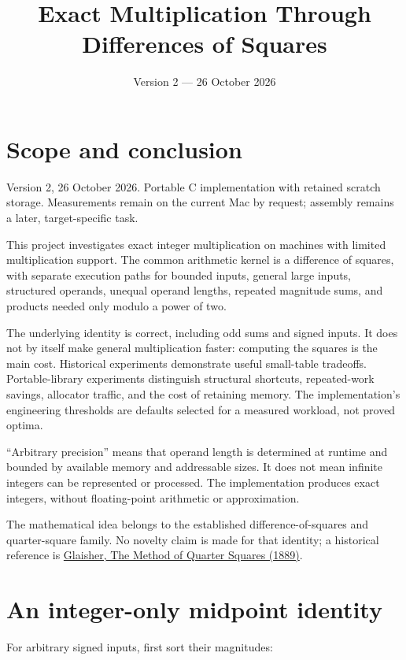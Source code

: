 \documentclass[11pt,a4paper]{article}
\title{Exact Multiplication Through Differences of Squares}
\author{}
\date{Version 2 --- 26 October 2026}
\begin{document}
\maketitle
\tableofcontents
\newpage

\section{Scope and conclusion}

Version 2, 26 October 2026. Portable C implementation with retained scratch storage. Measurements remain on the current Mac by request; assembly remains a later, target-specific task.

This project investigates exact integer multiplication on machines with limited multiplication support. The common arithmetic kernel is a difference of squares, with separate execution paths for bounded inputs, general large inputs, structured operands, unequal operand lengths, repeated magnitude sums, and products needed only modulo a power of two.

The underlying identity is correct, including odd sums and signed inputs. It does not by itself make general multiplication faster: computing the squares is the main cost. Historical experiments demonstrate useful small-table tradeoffs. Portable-library experiments distinguish structural shortcuts, repeated-work savings, allocator traffic, and the cost of retaining memory. The implementation's engineering thresholds are defaults selected for a measured workload, not proved optima.

``Arbitrary precision'' means that operand length is determined at runtime and bounded by available memory and addressable sizes. It does not mean infinite integers can be represented or processed. The implementation produces exact integers, without floating-point arithmetic or approximation.

The mathematical idea belongs to the established difference-of-squares and quarter-square family. No novelty claim is made for that identity; a historical reference is \href{\detokenize{https://www.nature.com/articles/040573c0}}{Glaisher, The Method of Quarter Squares (1889)}.

\section{An integer-only midpoint identity}

For arbitrary signed inputs, first sort their magnitudes:
\end{document}
